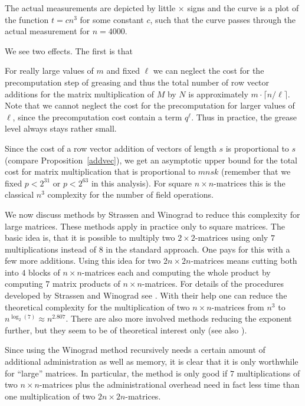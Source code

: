 The actual measurements are depicted by little $\times$ signs and
the curve is a plot of the function $t = cn^3$ for some constant $c$, such
that the curve passes through the actual measurement for $n=4000$.

We see two effects. The first is that 

For really large values of $m$ and fixed $\ell$ we can neglect the cost for the
precomputation step of greasing and thus the total number of row 
vector additions for the matrix multiplication of $M$ by $N$ is
approximately $m \cdot \lceil n/\ell \rceil$. Note that we cannot
neglect the cost for the precomputation for larger values of $\ell$,
since the precomputation cost contain a term $q^\ell$. Thus in practice,
the grease level always stays rather small.

Since the cost of
a row vector addition of vectors of length $s$ is proportional
to $s$ (compare Proposition~\ref{addvec}), we get an asymptotic upper
bound for the total cost for matrix multiplication that is proportional
to $mnsk$ (remember that we fixed $p < 2^{31}$ or $p< 2^{63}$ in this
analysis). For square $n \times n$-matrices this is the classical
$n^3$ complexity for the number of field operations.

We now discuss methods by Strassen and Winograd to reduce this complexity
for large matrices. These methods apply in practice only to square matrices.
The basic idea is, that it is possible to multiply two $2 \times 2$-matrices
using only $7$ multiplications instead of $8$ in the standard approach.
One pays for this with a few more additions. Using this idea for two 
$2n \times 2n$-matrices means cutting both into $4$ blocks of 
$n\times n$-matrices each and computing the whole product by computing
$7$ matrix products of $n \times n$-matrices. For details of the
procedures developed by Strassen and Winograd see \cite[4.6.4]{AOCP}.
With their help one can reduce the theoretical complexity for the 
multiplication of two $n \times n$-matrices from $n^3$
to $n^{\log_2(7)} \approx n^{2.807}$. 
There are also more involved methods reducing the exponent
further, but they seem to be of theoretical interest only (see 
also \cite[4.6.4]{AOCP}).

Since using the Winograd method recursively needs a certain amount of
additional administration as well as memory,
it is clear that it is only worthwhile for ``large'' matrices. In particular,
the method is only good if $7$ multiplications of two $n \times n$-matrices
plus the administrational overhead need in fact less time than one
multiplication of two $2n \times 2n$-matrices. 

